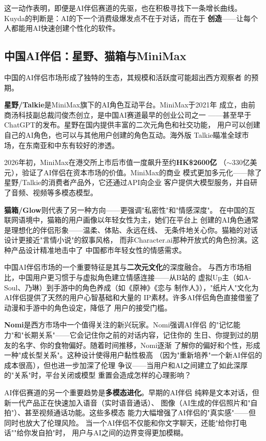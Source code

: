这一动作表明，即便是AI伴侣赛道的先驱，也在积极寻找下一条增长曲线。
Kuyda的判断是：AI的下一个消费级爆发点不在于对话，而在于
\textbf{创造}——让每个人都能用AI快速创建个性化的软件。

\subsection{中国AI伴侣：星野、猫箱与MiniMax}
\label{subsec:china-companions}

中国的AI伴侣市场形成了独特的生态，其规模和活跃度可能超出西方观察者
的预期。

\textbf{星野/Talkie}是MiniMax旗下的AI角色互动平台。MiniMax于2021年
成立，由前商汤科技副总裁闫俊杰创立，是中国AI赛道最早的创业公司之一
——甚至早于ChatGPT的发布。星野在国内提供丰富的二次元角色和社交功能，
用户可以创建自己的AI角色，也可以与其他用户创建的角色互动。海外版
Talkie瞄准全球市场，在东南亚和中东有较好的渗透。

2026年初，MiniMax在港交所上市后市值一度飙升至约\textbf{HK\$2600亿}
（$\sim$330亿美元），验证了AI伴侣在资本市场的价值。MiniMax的商业
模式更加多元化——除了星野/Talkie的消费者产品外，它还通过API向企业
客户提供大模型服务，并自研了音频、视频等多模态模型。

\textbf{猫箱/Glow}则代表了另一种方向——更强调"私密性"和"情感深度"。
在中国的互联网语境中，猫箱的用户画像以年轻女性为主，她们在平台上
创建的AI角色通常是理想化的伴侣形象——温柔、体贴、永远在线、
无条件地关心你。猫箱的对话设计更接近"言情小说"的叙事风格，
而非Character.ai那种开放式的角色扮演。这种产品设计精准地击中了
中国都市年轻女性的情感需求。

中国AI伴侣市场的一个重要特征是其与\textbf{二次元文化}的深度融合。
与西方市场相比，中国用户更习惯于与虚拟角色建立情感连接——从B站的
虚拟Up主（如A-Soul、乃琳）到手游中的角色养成（如《原神》《恋与
制作人》），"纸片人"文化为AI伴侣提供了天然的用户心智基础和大量的
IP素材。许多AI伴侣角色直接借鉴了动漫和手游中的角色设定，降低了
用户的接受门槛。

\textbf{Nomi}是西方市场中一个值得关注的新兴玩家。Nomi强调AI伴侣
的"记忆能力"和"长期关系"——它会记住你之前的对话内容，记住你的
生日、你提到过的朋友的名字、你的食物偏好。随着时间推移，Nomi逐渐
了解你的偏好和个性，形成一种"成长型关系"。这种设计使得用户黏性极高
（因为"重新培养"一个新AI伴侣的成本很高），但也进一步加深了伦理
争议——当用户和AI之间建立了如此深厚的"关系"时，平台关闭或模型
重置会造成怎样的心理影响？

AI伴侣赛道的另一个重要趋势是\textbf{多模态进化}。早期的AI伴侣
纯粹是文本对话，但新一代产品正在快速加入语音（实时语音通话）、
图像（AI生成的伴侣照片和"自拍"）、甚至视频通话功能。这些多模态
能力大幅增强了AI伴侣的"真实感"——但同时也放大了伦理风险。
当一个AI伴侣不仅能和你文字聊天，还能"给你打电话""给你发自拍"时，
用户与AI之间的边界变得更加模糊。

